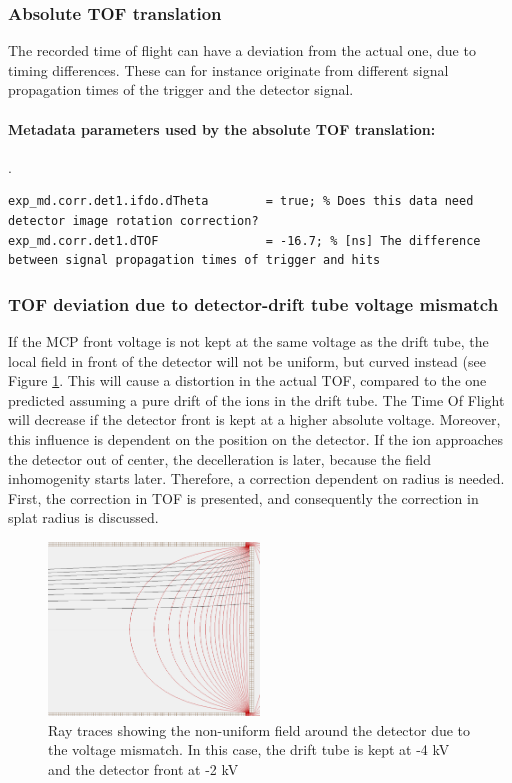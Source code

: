 \subsubsection{Absolute TOF translation}
The recorded time of flight can have a deviation from the actual one, due to timing differences. These can for instance originate from different signal propagation times of the trigger and the detector signal.

\paragraph{Metadata parameters used by the absolute TOF translation:}
.\newline
\lstset{language=MATLAB}
\begin{lstlisting}
exp_md.corr.det1.ifdo.dTheta 		= true; % Does this data need detector image rotation correction?
exp_md.corr.det1.dTOF 			 	= -16.7; % [ns] The difference between signal propagation times of trigger and hits
\end{lstlisting}

\subsubsection{TOF deviation due to detector-drift tube voltage mismatch}

If the MCP front voltage is not kept at the same voltage as the drift tube, the local field in front of the detector will not be uniform, but curved instead (see Figure \ref{detector_abberation_ray_traces}. This will cause a distortion in the actual TOF, compared to the one predicted assuming a pure drift of the ions in the drift tube. The Time Of Flight will decrease if the detector front is kept at a higher absolute voltage. Moreover, this influence is dependent on the position on the detector. If the ion approaches the detector out of center, the decelleration is later, because the field inhomogenity starts later. Therefore, a correction dependent on radius is needed. First, the correction in TOF is presented, and consequently the correction in splat radius is discussed.

\begin{figure}[h]
   \centering
    \centerline{\includegraphics[width=0.5\textwidth]{Graphics/detector_abberation_ray_traces.png}}
\caption{Ray traces showing the non-uniform field around the detector due to the voltage mismatch. In this case, the drift tube is kept at -4 kV and the detector front at -2 kV}
\label{detector_abberation_ray_traces}
\end{figure}


